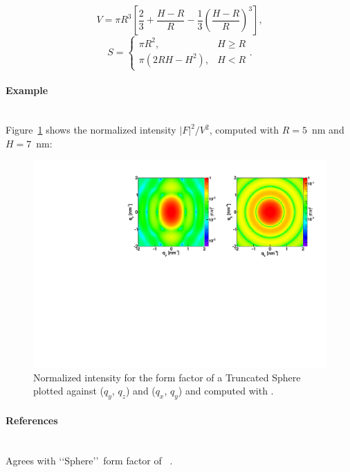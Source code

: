 \begin{equation*}
  V=\pi R^3 \left[\dfrac{2}{3} + \dfrac{H-R}{R} - \dfrac{1}{3}\left(\dfrac{H-R}{R}\right)^3\right],
\end{equation*}
\begin{equation*}
  S = \left\{\begin{array}{ll} \pi R^2, & H \geq R \\
         \pi\left(2RH-H^2\right), & H < R \end{array}\right..
\end{equation*}

\paragraph{Example}\strut\\
Figure~\ref{fig:SphereEx} shows the normalized intensity $|F|^2/V^2$, computed with $R=5$~nm and $H=7$~nm:
\begin{figure}[h]
\begin{center}
\includegraphics[angle=-90,width=\textwidth]{fig/ff/figffsphere.pdf}
\end{center}
\caption{Normalized intensity for the form factor of a Truncated Sphere plotted against ($q_y$, $q_z$) and ($q_x$, $q_y$) and
  computed with .}
\label{fig:SphereEx}
\end{figure}

\paragraph{References}\strut\\
Agrees with \lq\lq Sphere\rq\rq\ form factor of \IsGISAXS~\cite{Laz02}.

